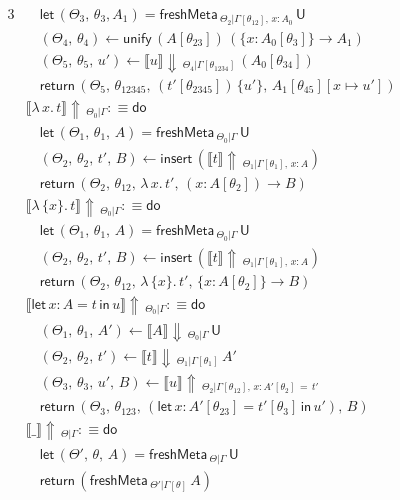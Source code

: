 \documentclass[acmsmall,screen,dvipsnames]{acmart}\settopmatter{}
\newcommand{\slet}{\boldsymbol{\mathsf{let}}}
\renewcommand{\sin}{\boldsymbol{\mathsf{in}}}
\renewcommand{\U}{\mathsf{U}}
\newcommand{\freshMeta}[3]{\mathsf{freshMeta}\,_{#1|#2}\,#3}
\newcommand{\unify}{\mathsf{unify}}
\newcommand{\echeck}[4]{\llbracket#1\rrbracket\!\Downarrow\,_{#2|#3}\,#4}
\newcommand{\einfer}[3]{\llbracket#1\rrbracket\!\Uparrow\,_{#2|#3}}
\newcommand{\edo}{\boldsymbol{\mathsf{do}}}
\newcommand{\ereturn}{\boldsymbol{\mathsf{return}}}
\newcommand{\einsert}{\mathsf{insert}}
\theoremstyle{remark}
\begin{document}
\begin{alignat*}{3}
  &\quad \slet\,(\Theta_3,\,\theta_3,A_1) = \freshMeta{\Theta_2}{\Gamma[\theta_{12}],\,x:A_0}{\U}\\
  &\quad (\Theta_4,\,\theta_4) \leftarrow \unify\,(A[\theta_{23}])\,(\{x : A_0[\theta_3]\}\to A_1)\\
  &\quad (\Theta_5,\,\theta_5,\,u') \leftarrow \echeck{u}{\Theta_4}{\Gamma[\theta_{1234}]}{(A_0[\theta_{34}])}\\
                 &\quad \ereturn\,(\Theta_5,\,\theta_{12345},\,(t'[\theta_{2345}])\,\{u'\},\,A_1[\theta_{45}][x\mapsto u'])\\
  &\einfer{\lambda\,x.\,t}{\Theta_0}{\Gamma} :\equiv \edo \\
  &\quad \slet\, (\Theta_1,\,\theta_1,\,A) = \freshMeta{\Theta_0}{\Gamma}{\U}\\
  &\quad(\Theta_2,\,\theta_2,\,t',\,B)\leftarrow \einsert\,(\einfer{t}{\Theta_1}{\Gamma[\theta_1],\,x:A})\\
  &\quad\ereturn\,(\Theta_2,\,\theta_{12},\,\lambda\,x.\,t',\,(x : A[\theta_2])\to B)\\
  &\einfer{\lambda\,\{x\}.\,t}{\Theta_0}{\Gamma} :\equiv \edo \\
  &\quad \slet\,(\Theta_1,\,\theta_1,\,A) = \freshMeta{\Theta_0}{\Gamma}{\U}\\
  &\quad(\Theta_2,\,\theta_2,\,t',\,B)\leftarrow \einsert\,(\einfer{t}{\Theta_1}{\Gamma[\theta_1],\,x:A}) \\
  &\quad\ereturn\,(\Theta_2,\,\theta_{12},\,\lambda\,\{x\}.\,t',\,\{x : A[\theta_2]\}\to B)\\
  &\einfer{\slet\,x:A=t\,\sin\,u}{\Theta_0}{\Gamma} :\equiv \edo \\
  &\quad(\Theta_1,\,\theta_1,\,A') \leftarrow \echeck{A}{\Theta_0}{\Gamma}{\U}\\
  &\quad(\Theta_2,\,\theta_2,\,t') \leftarrow \echeck{t}
                {\Theta_1}{\Gamma[\theta_1]}{A'}\\
  &\quad(\Theta_3,\,\theta_3,\,u',\,B) \leftarrow
                \einfer{u}{\Theta_2}{\Gamma[\theta_{12}],\,x:A'[\theta_2]\,=\,t'}\\
  &\quad\ereturn\,(\Theta_3,\,\theta_{123},\,(\slet\,x:A'[\theta_{23}]=t'[\theta_3]\,\sin\,u'),\,B)\\
  &\einfer{\_}{\Theta}{\Gamma} :\equiv \edo \\
  &\quad \slet\,(\Theta',\,\theta,\,A) = \freshMeta{\Theta}{\Gamma}{\U}\\
  &\quad \ereturn\,(\freshMeta{\Theta'}{\Gamma[\theta]}{A})\\
\end{alignat*}
\endgroup
\end{document}
